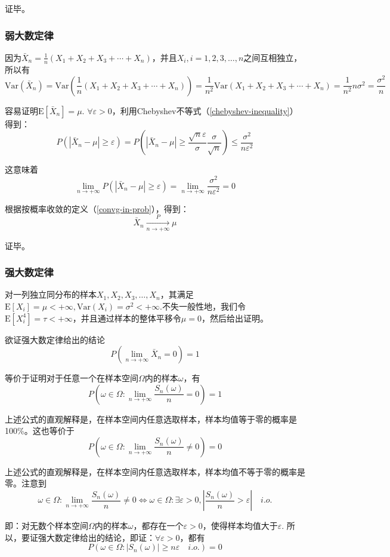 \documentclass[UTF8]{ctexbook}
\begin{document}
证毕。

\subsubsection{弱大数定律}
\label{WLLN-proof}
因为$\bar{X}_n=\frac{1}{n}(X_1+X_2+X_3+\cdots+X_n)$，并且$X_i,i=1,2,3,\dots,n$之间互相独立，所以有
\[
	\mathrm{Var}(\bar{X}_n)=\mathrm{Var}(\frac{1}{n}(X_1+X_2+X_3+\cdots+X_n))=\frac{1}{n^2}\mathrm{Var}(X_1+X_2+X_3+\cdots+X_n)=\frac{1}{n^2}n\sigma^2=\frac{\sigma^2}{n}
\]

容易证明$\mathrm E[\bar{X}_n]=\mu$. $\forall\varepsilon>0$，利用Chebyshev不等式（\ref{chebyshev-inequality}）得到：
\[
	P(|\bar{X}_n-\mu|\geq\varepsilon)=P(|\bar{X}_n-\mu|\geq\frac{\sqrt{n}\varepsilon}{\sigma}\frac{\sigma}{\sqrt{n}})\leq\frac{\sigma^2}{n\varepsilon^2}
\]

这意味着
\[
	\lim_{n\to+\infty}P(|\bar{X}_n-\mu|\geq\varepsilon)=\lim_{n\to+\infty}\frac{\sigma^2}{n\varepsilon^2}=0
\]

根据按概率收敛的定义（\ref{convg-in-prob}），得到：
\[
	\bar{X}_n\xrightarrow[n\to+\infty]{P}\mu
\]

证毕。
\subsubsection{强大数定律}
\label{SLLN-proof}
对一列独立同分布的样本$X_1,X_2,X_3,\dots,X_n$，其满足$\mathrm E[X_i]=\mu<+\infty,\mathrm{Var}(X_i)=\sigma^2<+\infty$.不失一般性地，我们令$\mathrm E[X_i^4]=\tau<+\infty$，并且通过样本的整体平移令$\mu=0$，然后给出证明。

欲证强大数定律给出的结论
\[
	P\left(\lim_{n\to+\infty}\bar{X}_n=0\right)=1
\]

等价于证明对于任意一个在样本空间$\Omega$内的样本$\omega$，有
\[
	P\left(\omega\in\Omega:\lim_{n\to+\infty}\frac{S_n(\omega)}{n}=0\right)=1
\]

上述公式的直观解释是，在样本空间内任意选取样本，样本均值等于零的概率是100\%。这也等价于
\[
	P\left(\omega\in\Omega:\lim_{n\to+\infty}\frac{S_n(\omega)}{n}\neq0\right)=0
\]

上述公式的直观解释是，在样本空间内任意选取样本，样本均值不等于零的概率是零。注意到
\[
	\omega\in\Omega:\lim_{n\to+\infty}\frac{S_n(\omega)}{n}\neq0\Longleftrightarrow\omega\in\Omega:\exists\varepsilon>0,\left|\frac{S_n(\omega)}{n}>\varepsilon\right|\quad i.o.
\]

即：对无数个样本空间$\Omega$内的样本$\omega$，都存在一个$\varepsilon>0$，使得样本均值大于$\varepsilon$. 所以，要证强大数定律给出的结论，即证：$\forall\varepsilon>0$，都有
\[
	P\left(\omega\in\Omega:|S_n(\omega)|\geq n\varepsilon\quad i.o.\right)=0
\]
\end{document}

